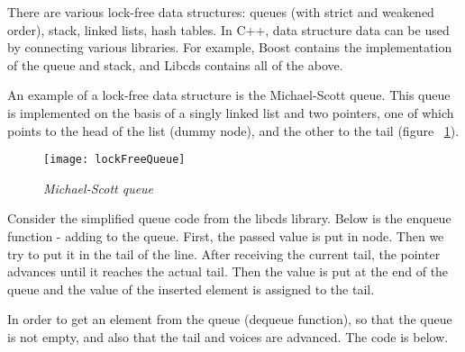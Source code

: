 {\begin{itemize}
	\end{itemize}
	\par There are various lock-free data structures: queues (with strict and weakened order), stack, linked lists, hash tables. In C++, data structure data can be used by connecting various libraries. For example, Boost contains the implementation of the queue and stack, and Libcds contains all of the above.
	\par An example of a lock-free data structure is the Michael-Scott queue. This queue is implemented on the basis of a singly linked list and two pointers, one of which points to the head of the list (dummy node), and the other to the tail (figure ~\ref{lockFreeQueue:image}).
	\begin{figure}[H]
		\texttt{[image: lockFreeQueue]}
		\caption{\textit{Michael-Scott queue}}
		\label{lockFreeQueue:image}
	\end{figure}
	\par Consider the simplified queue code from the libcds library. Below is the enqueue function - adding to the queue. First, the passed value is put in node. Then we try to put it in the tail of the line. After receiving the current tail, the pointer advances until it reaches the actual tail. Then the value is put at the end of the queue and the value of the inserted element is assigned to the tail.
	\begin{figure}[H]
		
	\end{figure}
	\par In order to get an element from the queue (dequeue function), so that the queue is not empty, and also that the tail and voices are advanced. The code is below.
	\begin{figure}[H]
		
	\end{figure}
}